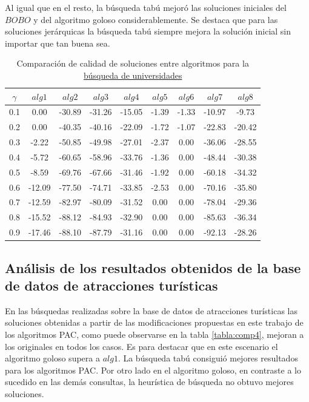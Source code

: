 Al igual que en el resto, la búsqueda tabú mejoró las soluciones iniciales del $BOBO$ y del algoritmo goloso considerablemente. Se destaca que para las soluciones jerárquicas la búsqueda tabú siempre mejora la solución inicial sin importar que tan buena sea.
\begin{table}[H]
\begin{center}
\begin{tabular}{|c|c|c|c|c|c|c|c|c|}
\hline
$\gamma$&$alg1$&$alg2$&$alg3$&$alg4$&$alg5$&$alg6$&$alg7$&$alg8$ \\ \hline
0.1 & 0.00 & -30.89 & -31.26 & -15.05 & -1.39 & -1.33 & -10.97 & -9.73 \\
0.2 & 0.00 & -40.35 & -40.16 & -22.09 & -1.72 & -1.07 & -22.83 & -20.42 \\
0.3 & -2.22 & -50.85 & -49.98 & -27.01 & -2.37 & 0.00 & -36.06 & -28.55 \\
0.4 & -5.72 & -60.65 & -58.96 & -33.76 & -1.36 & 0.00 & -48.44 & -30.38 \\
0.5 & -8.59 & -69.76 & -67.66 & -31.46 & -1.92 & 0.00 & -60.18 & -34.32 \\
0.6 & -12.09 & -77.50 & -74.71 & -33.85 & -2.53 & 0.00 & -70.16 & -35.80 \\
0.7 & -12.59 & -82.97 & -80.09 & -31.52 & 0.00 & 0.00 & -78.04 & -29.36 \\
0.8 & -15.52 & -88.12 & -84.93 & -32.90 & 0.00 & 0.00 & -85.63 & -36.34 \\
0.9 & -17.46 & -88.10 & -87.79 & -31.16 & 0.00 & 0.00 & -92.13 & -28.26 \\
 \hline 
\end{tabular}
\caption{Comparación de calidad de soluciones entre algoritmos para la \hyperref[busqueda:universidades]{búsqueda de universidades}} 
\label{tabla:comp3}
\end{center}
\end{table}

\subsection{Análisis de los resultados obtenidos de la base de datos de atracciones turísticas}\label{res:busAtracciones}
En las búsquedas realizadas sobre la base de datos de atracciones turísticas las soluciones obtenidas a partir de las modificaciones propuestas en este trabajo de los algoritmos PAC, como puede observarse en la tabla \ref{tabla:comp4}, mejoran a los originales en todos los casos. Es para destacar que en este escenario el algoritmo goloso supera a $alg1$. La búsqueda tabú consiguió mejores resultados para los algoritmos PAC. Por otro lado en el algoritmo goloso, en contraste a lo sucedido en las demás consultas, la heurística de búsqueda no obtuvo mejores soluciones.

